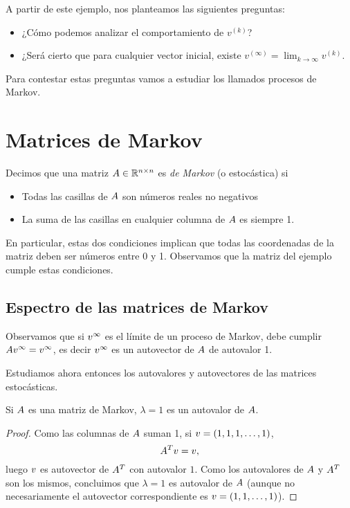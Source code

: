 A partir de este ejemplo, nos planteamos las siguientes preguntas:
\begin{itemize}
\item ¿Cómo podemos analizar el comportamiento de $v^{(k)}$?
\item ¿Será cierto que para cualquier vector inicial, existe $v^{(\infty)} = \lim_{k \rightarrow \infty} v^{(k)}$.
\end{itemize}

Para contestar estas preguntas vamos a estudiar los llamados procesos de Markov.

\section{Matrices de Markov}

\begin{defi}
Decimos que una matriz $\Ab \in \Rnn$ es \emph{de Markov} (o estocástica) si
\begin{itemize}
\item Todas las casillas de $\Ab$ son números reales no negativos
\item La suma de las casillas en cualquier columna de $\Ab$ es siempre 1.
\end{itemize}
\end{defi}

En particular, estas dos condiciones implican que todas las coordenadas de la matriz deben ser números entre 0 y 1. Observamos que la matriz del ejemplo cumple estas condiciones.

\subsection{Espectro de las matrices de Markov}

Observamos que si $\vb^{\infty}$ es el límite de un proceso de Markov, debe cumplir $\Ab \vb^{\infty} = \vb^{\infty}$, es decir $\vb^{\infty}$ es un autovector de $\Ab$ de autovalor 1.

Estudiamos ahora entonces los autovalores y autovectores de las matrices estocásticas.

\begin{prop}
Si $\Ab$ es una matriz de Markov, $\lambda = 1$ es un autovalor de $\Ab$.
\end{prop}

\begin{proof}
Como las columnas de $\Ab$ suman 1, si $\vb = (1,1,1, \dots, 1)$,
$$\Ab^T \vb = \vb,$$
luego $\vb$ es autovector de $\Ab^T$ con autovalor $1$. Como los autovalores de $\Ab$ y $\Ab^T$ son los mismos, concluimos que $\lambda = 1$ es autovalor de $\Ab$ (aunque no necesariamente el autovector correspondiente es $\vb = (1, 1, \dots, 1)$).
\end{proof}

